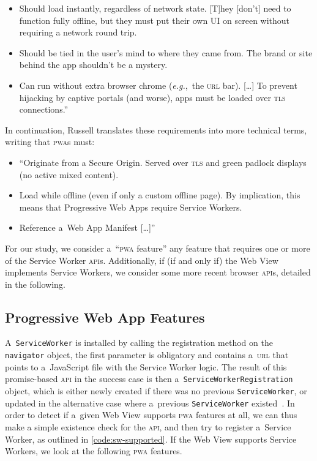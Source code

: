 \documentclass[sigconf]{acmart}
\begin{document}
\begin{itemize}
  \item Should load instantly, regardless of network state.
    [T]hey [don't] need to function fully offline,
    but they must put their own UI on screen without requiring a network round trip.
  \item Should be tied in the user's mind to where they came from.
    The brand or site behind the app shouldn't be a mystery.
  \item Can run without extra browser chrome (\emph{e.g.},\ the \textsc{url} bar).
    [\ldots] To prevent hijacking by captive portals (and worse),
    apps must be loaded over \textsc{tls} connections.''
\end{itemize}

In continuation, Russell translates these requirements into more technical terms,
writing that \textsc{pwa}s must:

\begin{itemize}
  \item ``Originate from a Secure Origin.
    Served over \textsc{tls} and green padlock displays (no active mixed content).
  \item Load while offline (even if only a custom offline page).
    By implication, this means that Progressive Web Apps require Service Workers.
  \item Reference a~Web App Manifest [\ldots]''
\end{itemize}

For our study, we consider a~``\textsc{pwa} feature'' any feature that requires 
one or more of the Service Worker \textsc{api}s.
Additionally, if (if and only if) the Web View implements Service Workers,
we consider some more recent browser \textsc{api}s,
detailed in the following.

\subsection{Progressive Web App Features}

A~\texttt{ServiceWorker} is installed by calling the registration method
on the \texttt{navigator} object, the first parameter is obligatory
and contains a~\textsc{url} that points to a~JavaScript file with the Service Worker logic.
The result of this promise-based \textsc{api} in the success case is then
a~\texttt{ServiceWorkerRegistration} object,
which is either newly created if there was no previous \texttt{ServiceWorker},
or updated in the alternative case
where a~previous \texttt{ServiceWorker} existed~\cite{russell2017serviceworkers}.
In order to detect if a~given Web View supports \textsc{pwa} features at all,
we can thus make a simple existence check for the \textsc{api},
and then try to register a~Service Worker, as outlined in \autoref{code:sw-supported}.
If the Web View supports Service Workers, we look at the following \textsc{pwa} features.
\end{document}

